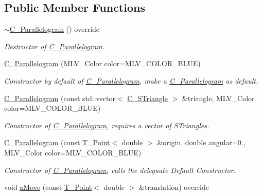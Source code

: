\subsection*{Public Member Functions}
\begin{DoxyCompactItemize}
\item 
\hyperlink{classC__Parallelogram_a2d7af48f3a26e8e07031e7c147a084a3}{$\sim$\+C\+\_\+\+Parallelogram} () override
\begin{DoxyCompactList}\small\item\em Destructor of \hyperlink{classC__Parallelogram}{C\+\_\+\+Parallelogram}. \end{DoxyCompactList}\item 
\hyperlink{classC__Parallelogram_a85d543d3a3a118676e7e47cff7ce82be}{C\+\_\+\+Parallelogram} (M\+L\+V\+\_\+\+Color color=M\+L\+V\+\_\+\+C\+O\+L\+O\+R\+\_\+\+B\+L\+UE)
\begin{DoxyCompactList}\small\item\em Constructor by default of \hyperlink{classC__Parallelogram}{C\+\_\+\+Parallelogram}, make a \hyperlink{classC__Parallelogram}{C\+\_\+\+Parallelogram} as default. \end{DoxyCompactList}\item 
\hyperlink{classC__Parallelogram_a6e31f5dcaf076ca4b745c0b0108bb809}{C\+\_\+\+Parallelogram} (const std\+::vector$<$ \hyperlink{classC__STriangle}{C\+\_\+\+S\+Triangle} $>$ \&triangle, M\+L\+V\+\_\+\+Color color=M\+L\+V\+\_\+\+C\+O\+L\+O\+R\+\_\+\+B\+L\+UE)
\begin{DoxyCompactList}\small\item\em Constructor of \hyperlink{classC__Parallelogram}{C\+\_\+\+Parallelogram}, requires a vector of S\+Triangles. \end{DoxyCompactList}\item 
\hyperlink{classC__Parallelogram_abd470868efc5d3a002509a9e45e4ed63}{C\+\_\+\+Parallelogram} (const \hyperlink{classT__Point}{T\+\_\+\+Point}$<$ double $>$ \&origin, double angular=0., M\+L\+V\+\_\+\+Color color=M\+L\+V\+\_\+\+C\+O\+L\+O\+R\+\_\+\+B\+L\+UE)
\begin{DoxyCompactList}\small\item\em Constructor of \hyperlink{classC__Parallelogram}{C\+\_\+\+Parallelogram}, calls the deleguate Default Constructor. \end{DoxyCompactList}\item 
void \hyperlink{classC__Parallelogram_ac77ea776b24c551114d84eaf147f6977}{a\+Move} (const \hyperlink{classT__Point}{T\+\_\+\+Point}$<$ double $>$ \&translation) override

\end{DoxyCompactItemize}
